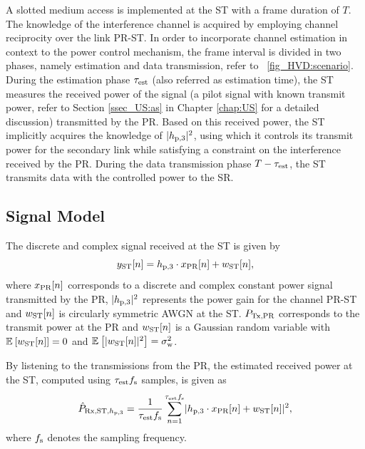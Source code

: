 A slotted medium access is implemented at the ST with a frame duration of $T$. The knowledge of the interference channel is acquired by employing channel reciprocity over the link PR-ST. %
In order to incorporate channel estimation in context to the power control mechanism, the frame interval is divided in two phases, namely estimation and data transmission, refer to \figurename~\ref{fig_HVD:scenario}. During the estimation phase $\tau_{\text{est}}$ (also referred as estimation time), the ST measures the received power of the signal (a pilot signal with known transmit power, refer to Section \ref{ssec_US:as} in Chapter \ref{chap:US} for a detailed discussion) transmitted by the PR. Based on this received power, the ST implicitly acquires the knowledge of $|h_{\text{p,3}}|^2$, using which it controls its transmit power for the secondary link while satisfying a constraint on the interference received by the PR. During the data transmission phase $T-\tau_{\text{est}}$, the ST transmits data with the controlled power to the SR.

\subsection{Signal Model}
The discrete and complex signal received at the ST is given by
\begin{equation}
y_{\text{ST}}[n] = h_{\text{p,3}} \cdot x_{\text{PR}}[n] + w_{\text{ST}}[n],
\label{eq_HVD:sys_mod_st}
\end{equation}
where $x_{\text{PR}}[n]$ corresponds to a discrete and complex  constant power signal transmitted by the PR, $|h_{\text{p,3}}|^2$ represents the power gain for the channel PR-ST and $w_{\text{ST}}[n]$ is circularly symmetric AWGN at the ST.
 $P_{\text{Tx,PR}}$  corresponds to the transmit power at the PR and $w_{\text{ST}}[n]$ is a Gaussian random variable with ${\mathbb E}_{}\left[ w_{\text{ST}}[n] \right] = 0$ and ${\mathbb E}_{}\left[ |w_{\text{ST}}[n]|^2 \right] = \sigma^2_{\text{w}}$. 

By listening to the transmissions from the PR, the estimated received power at the ST, computed using $\tau_{\text{est}} f_{\text{s}}$ samples, is given as
\begin{align}
\hat{P}_{\text{Rx,ST,$h_{\text{p,3}}$}} = {\frac{1}{{\tau_{\text{est}} f_{\text{s}}}}\sum_{n=1}^{\tau_{\text{est}} f_{\text{s}}}} { |h_{\text{p,3}} \cdot x_{\text{PR}}[n] + w_{\text{ST}}[n]|^2},
\label{eq_HVD:prcvd} 
\end{align}
where $f_{\text{s}}$ denotes the sampling frequency. 

